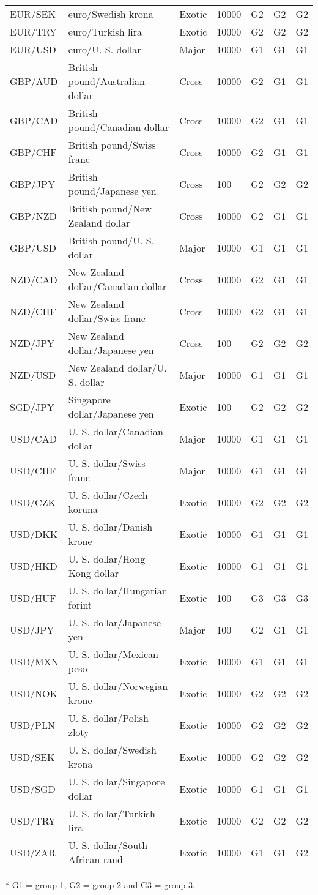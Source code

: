 \begin{table*}
\begin{center}
\begin{centering}
\begin{threeparttable}
\begin{tabular}{lllllll}
    EUR/SEK & euro/Swedish krona & Exotic & 10000 & G2 & G2 & G2\tabularnewline
    EUR/TRY & euro/Turkish lira & Exotic & 10000 & G2 & G2 & G2\tabularnewline
    EUR/USD & euro/U. S. dollar & Major & 10000 & G1 & G1 & G1\tabularnewline
    GBP/AUD & British pound/Australian dollar & Cross & 10000 & G2 & G1 & G1\tabularnewline
    GBP/CAD & British pound/Canadian dollar & Cross & 10000 & G2 & G1 & G1\tabularnewline
    GBP/CHF & British pound/Swiss franc & Cross & 10000 & G2 & G1 & G1\tabularnewline
    GBP/JPY & British pound/Japanese yen & Cross & 100 & G2 & G2 & G2\tabularnewline
    GBP/NZD & British pound/New Zealand dollar & Cross & 10000 & G2 & G1 & G1\tabularnewline
    GBP/USD & British pound/U. S. dollar & Major & 10000 & G1 & G1 & G1\tabularnewline
    NZD/CAD & New Zealand dollar/Canadian dollar & Cross & 10000 & G2 & G1 & G1\tabularnewline
    NZD/CHF & New Zealand dollar/Swiss franc & Cross & 10000 & G2 & G1 & G1\tabularnewline
    NZD/JPY & New Zealand dollar/Japanese yen & Cross & 100 & G2 & G2 & G2\tabularnewline
    NZD/USD & New Zealand dollar/U. S. dollar & Major & 10000 & G1 & G1 & G1\tabularnewline
    SGD/JPY & Singapore dollar/Japanese yen & Exotic & 100 & G2 & G2 & G2\tabularnewline
    USD/CAD & U. S. dollar/Canadian dollar & Major & 10000 & G1 & G1 & G1\tabularnewline
    USD/CHF & U. S. dollar/Swiss franc & Major & 10000 & G1 & G1 & G1\tabularnewline
    USD/CZK & U. S. dollar/Czech koruna & Exotic & 10000 & G2 & G2 & G2\tabularnewline
    USD/DKK & U. S. dollar/Danish krone & Exotic & 10000 & G1 & G1 & G1\tabularnewline
    USD/HKD & U. S. dollar/Hong Kong dollar & Exotic & 10000 & G1 & G1 & G1\tabularnewline
    USD/HUF & U. S. dollar/Hungarian forint & Exotic & 100 & G3 & G3 & G3\tabularnewline
    USD/JPY & U. S. dollar/Japanese yen & Major & 100 & G2 & G1 & G1\tabularnewline
    USD/MXN & U. S. dollar/Mexican peso & Exotic & 10000 & G1 & G1 & G1\tabularnewline
    USD/NOK & U. S. dollar/Norwegian krone & Exotic & 10000 & G2 & G2 & G2\tabularnewline
    USD/PLN & U. S. dollar/Polish zloty & Exotic & 10000 & G2 & G2 & G2\tabularnewline
    USD/SEK & U. S. dollar/Swedish krona & Exotic & 10000 & G2 & G2 & G2\tabularnewline
    USD/SGD & U. S. dollar/Singapore dollar & Exotic & 10000 & G1 & G1 & G1\tabularnewline
    USD/TRY & U. S. dollar/Turkish lira & Exotic & 10000 & G2 & G2 & G2\tabularnewline
    USD/ZAR & U. S. dollar/South African rand & Exotic & 10000 & G1 & G1 & G2\tabularnewline
    \end{tabular}

    \begin{tablenotes}
    \item[*] G1 = group 1, G2 = group 2 and G3 = group 3.
    \end{tablenotes}
    \end{threeparttable}
\end{centering}
\end{center}
\end{table*}

